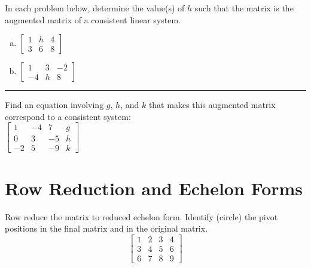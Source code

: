 \begin{exercise} %
	In each problem below, determine the value(s) of $h$ such that the matrix is the augmented matrix of a consistent linear system.
	\begin{multicols}{2}
		\begin{enumerate}[(a)]
			\item
			$\begin{bmatrix}
			1 & h & 4 \\
			3 & 6 & 8
			\end{bmatrix}$
			\item
			$\begin{bmatrix}
			1 & 3 & -2 \\
			-4 & h &  8
			\end{bmatrix}$
		\end{enumerate}
	\end{multicols}
\end{exercise}
\vfill


\hrule

\begin{exercise} %
	Find an equation involving $g$, $h$, and $k$ that makes this augmented matrix correspond to a consistent system: \\
	
	$\begin{bmatrix}
	 1 & -4 &  7 & g \\
	 0 &  3 & -5 & h \\
	-2 &  5 & -9 & k
	\end{bmatrix}$
\end{exercise}


\newpage



\section{Row Reduction and Echelon Forms}
\name[2in]

\begin{exercise} %
Row reduce the matrix to reduced echelon form. Identify (circle) the pivot positions in the final matrix and in the original matrix.
\[\begin{bmatrix}
	1 & 2 & 3 & 4 \\ 
	3 & 4 & 5 & 6 \\ 
	6 & 7 & 8 & 9
\end{bmatrix}
\]
\end{exercise}
\vfill


